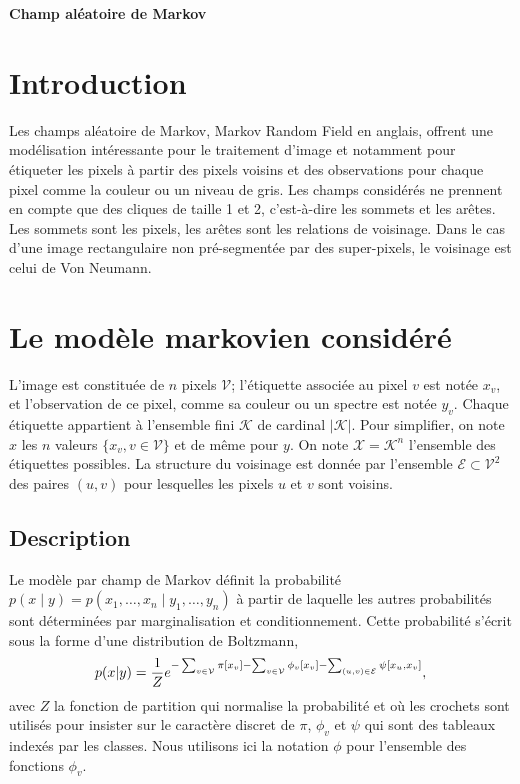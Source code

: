 \documentclass[a4paper,11pt,oneside]{article}
\begin{document}
\centerline{\sffamily\bfseries\LARGE Champ aléatoire de Markov}
\bigskip

\section{Introduction}
\label{sec:introduction}

Les champs aléatoire de Markov, \textenglish{Markov Random
  Field} en anglais, offrent une modélisation intéressante
pour le traitement d'image et notamment pour étiqueter les
pixels à partir des pixels voisins et des observations pour
chaque pixel comme la couleur ou un niveau de gris. Les
champs considérés ne prennent en compte que des cliques de
taille 1 et 2, c'est-à-dire les sommets et les arêtes. Les
sommets sont les pixels, les arêtes sont les relations de
voisinage. Dans le cas d'une image rectangulaire non
pré-segmentée par des super-pixels, le voisinage est celui
de Von Neumann.




\section{Le modèle markovien considéré}
\label{sec:modele}

L'image est constituée de $n$ pixels $\mathcal V$;
l'étiquette associée au pixel $v$ est notée $x_v$, et
l'observation de ce pixel, comme sa couleur ou un spectre
est notée $y_v$. Chaque étiquette appartient à l'ensemble
fini $\mathcal K$ de cardinal $|\mathcal K|$. Pour
simplifier, on note $x$ les $n$ valeurs $\{x_v, v\in\mathcal
V\}$ et de même pour $y$. On note $\mathcal X=\mathcal K^n$
l'ensemble des étiquettes possibles. La structure du
voisinage est donnée par l'ensemble $\mathcal
E\subset\mathcal V^2$ des paires $(u, v)$ pour lesquelles
les pixels $u$ et $v$ sont voisins.



\subsection{Description}
\label{sec:description}

Le modèle par champ de Markov définit la probabilité $p(x
\mid y) = p(x_1,\ldots,x_n \mid y_1,\ldots,y_n)$ à partir de
laquelle les autres probabilités sont déterminées par
marginalisation et conditionnement. Cette probabilité
s'écrit sous la forme d'une distribution de Boltzmann,
\begin{equation}
  \label{eq:1}
  p(x|y) = \frac1Z e^{%
    - \sum_{v\in\mathcal V} \pi[x_v]%
    - \sum_{v\in\mathcal V} \phi_v[x_v]
    - \sum_{(u,v)\in\mathcal E} \psi[x_u, x_v]},
\end{equation}
avec $Z$ la fonction de partition qui normalise la
probabilité et où les crochets sont utilisés pour insister
sur le caractère discret de $\pi$, $\phi_v$ et $\psi$ qui
sont des tableaux indexés par les classes. Nous utilisons
ici la notation $\phi$ pour l'ensemble des fonctions
$\phi_v$.
\end{document}
